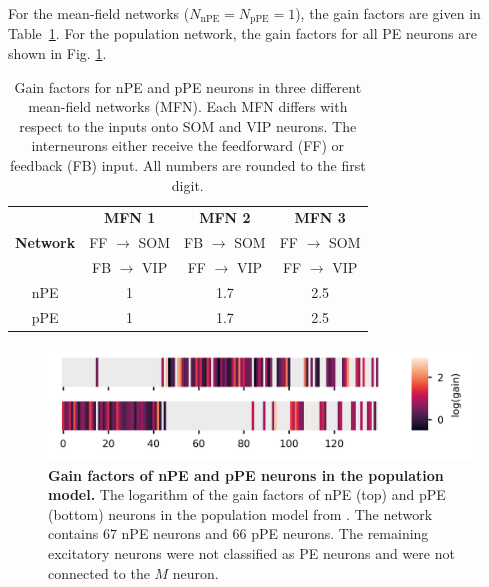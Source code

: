 \documentclass[10pt,a4paper,draft]{article}
\begin{document}
For the mean-field networks ($ N_\mathrm{nPE} = N_\mathrm{pPE} = 1 $), the gain factors are given in Table~\ref{tab:gain_factors_MFN}. For the population network, the gain factors for all PE neurons are shown in Fig. \ref{fig:Fig_gains}. 
%
\begin{table}[h!]
\centering
\begin{tabular}{ |c|c|c|c| }
\hline
 & \textbf{MFN 1} & \textbf{MFN 2} & \textbf{MFN 3}  \\
\textbf{Network} & FF $\rightarrow$ SOM  & FB $\rightarrow$ SOM  & FF $\rightarrow$ SOM  \\
 & FB $\rightarrow$ VIP  & FF $\rightarrow$ VIP  & FF $\rightarrow$ VIP  \\
\hline
\hline
nPE & 1 & 1.7 & 2.5\\
pPE & 1 & 1.7 & 2.5 \\
\hline
\end{tabular}
\caption{\footnotesize{Gain factors for nPE and pPE neurons in three different mean-field networks (MFN). Each MFN differs with respect to the inputs onto SOM and VIP neurons. The interneurons either receive the feedforward (FF) or feedback (FB) input. All numbers are rounded to the first digit.}}
\label{tab:gain_factors_MFN}
\end{table}
%
%
\begin{figure}[h!]
	\centering
    \includegraphics{../results/figures/final/Figure_gains}
\caption{\footnotesize{\bf Gain factors of nPE and pPE neurons in the population model.\newline}
{The logarithm of the gain factors of nPE (top) and pPE (bottom) neurons in the population model from \citep{hertag2022prediction}. The network contains $67$ nPE neurons and $66$ pPE neurons. The remaining excitatory neurons were not classified as PE neurons and were not connected to the $M$ neuron.}}
\label{fig:Fig_gains}
\end{figure}
%
%
\end{document}
